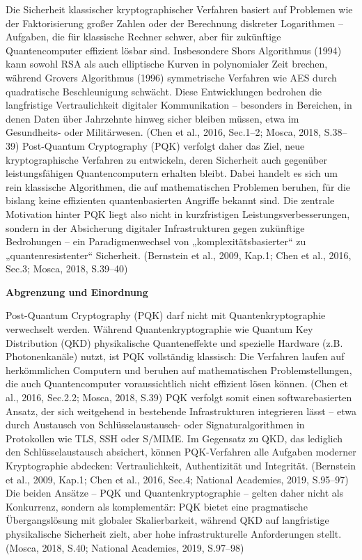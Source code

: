 \noindent
Die Sicherheit klassischer kryptographischer Verfahren basiert auf Problemen wie der Faktorisierung großer Zahlen oder der Berechnung diskreter Logarithmen – Aufgaben, die für klassische Rechner schwer, aber für zukünftige Quantencomputer effizient lösbar sind. Insbesondere Shors Algorithmus (1994) kann sowohl RSA als auch elliptische Kurven in polynomialer Zeit brechen, während Grovers Algorithmus (1996) symmetrische Verfahren wie AES durch quadratische Beschleunigung schwächt. Diese Entwicklungen bedrohen die langfristige Vertraulichkeit digitaler Kommunikation – besonders in Bereichen, in denen Daten über Jahrzehnte hinweg sicher bleiben müssen, etwa im Gesundheits- oder Militärwesen.
 (Chen et al., 2016, Sec.1–2; Mosca, 2018, S.38–39)
Post-Quantum Cryptography (PQK) verfolgt daher das Ziel, neue kryptographische Verfahren zu entwickeln, deren Sicherheit auch gegenüber leistungsfähigen Quantencomputern erhalten bleibt. Dabei handelt es sich um rein klassische Algorithmen, die auf mathematischen Problemen beruhen, für die bislang keine effizienten quantenbasierten Angriffe bekannt sind. Die zentrale Motivation hinter PQK liegt also nicht in kurzfristigen Leistungsverbesserungen, sondern in der Absicherung digitaler Infrastrukturen gegen zukünftige Bedrohungen – ein Paradigmenwechsel von „komplexitätsbasierter“ zu „quantenresistenter“ Sicherheit.
(Bernstein et al., 2009, Kap.1; Chen et al., 2016, Sec.3; Mosca, 2018, S.39–40)


\vspace{1em}
\noindent\textbf{Abgrenzung und Einordnung}

\noindent
Post-Quantum Cryptography (PQK) darf nicht mit Quantenkryptographie verwechselt werden. Während Quantenkryptographie wie Quantum Key Distribution (QKD) physikalische Quanteneffekte und spezielle Hardware (z.B. Photonenkanäle) nutzt, ist PQK vollständig klassisch: Die Verfahren laufen auf herkömmlichen Computern und beruhen auf mathematischen Problemstellungen, die auch Quantencomputer voraussichtlich nicht effizient lösen können.
 (Chen et al., 2016, Sec.2.2; Mosca, 2018, S.39)
PQK verfolgt somit einen softwarebasierten Ansatz, der sich weitgehend in bestehende Infrastrukturen integrieren lässt – etwa durch Austausch von Schlüsselaustausch- oder Signaturalgorithmen in Protokollen wie TLS, SSH oder S/MIME. Im Gegensatz zu QKD, das lediglich den Schlüsselaustausch absichert, können PQK-Verfahren alle Aufgaben moderner Kryptographie abdecken: Vertraulichkeit, Authentizität und Integrität.
 (Bernstein et al., 2009, Kap.1; Chen et al., 2016, Sec.4; National Academies, 2019, S.95–97)
Die beiden Ansätze – PQK und Quantenkryptographie – gelten daher nicht als Konkurrenz, sondern als komplementär: PQK bietet eine pragmatische Übergangslösung mit globaler Skalierbarkeit, während QKD auf langfristige physikalische Sicherheit zielt, aber hohe infrastrukturelle Anforderungen stellt.
 (Mosca, 2018, S.40; National Academies, 2019, S.97–98)


